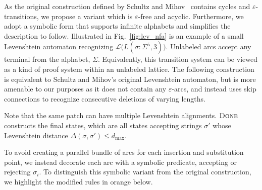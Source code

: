 \documentclass[sigplan,acmsmall,nonacm,screen]{acmart}\settopmatter{printfolios=false,printccs=false,printacmref=false}
\begin{document}
As the original construction defined by Schultz and Mihov~\cite{schulz2002fast} contains cycles and $\varepsilon$-transitions, we propose a variant which is $\varepsilon$-free and acyclic. Furthermore, we adopt a symbolic form that supports infinite alphabets and simplifies the description to follow. Illustrated in Fig.~\ref{fig:lev_nfa} is an example of a small Levenshtein automaton recognizing $\mathcal{L}\big(L(\sigma: \Sigma^5, 3)\big)$. Unlabeled arcs accept any terminal from the alphabet, $\Sigma$. Equivalently, this transition system can be viewed as a kind of proof system within an unlabeled lattice. The following construction is equivalent to Schultz and Mihov's original Levenshtein automaton, but is more amenable to our purposes as it does not contain any $\varepsilon$-arcs, and instead uses skip connections to recognize consecutive deletions of varying lengths.



Note that the same patch can have multiple Levenshtein alignments. $\textsc{Done}$ constructs the final states, which are all states accepting strings $\sigma'$ whose Levenshtein distance $\Delta(\sigma, \sigma') \leq d_\max$.

To avoid creating a parallel bundle of arcs for each insertion and substitution point, we instead decorate each arc with a symbolic predicate, accepting or rejecting $\sigma_i$. To distinguish this symbolic variant from the original construction, we highlight the modified rules in orange below.

\end{document}
